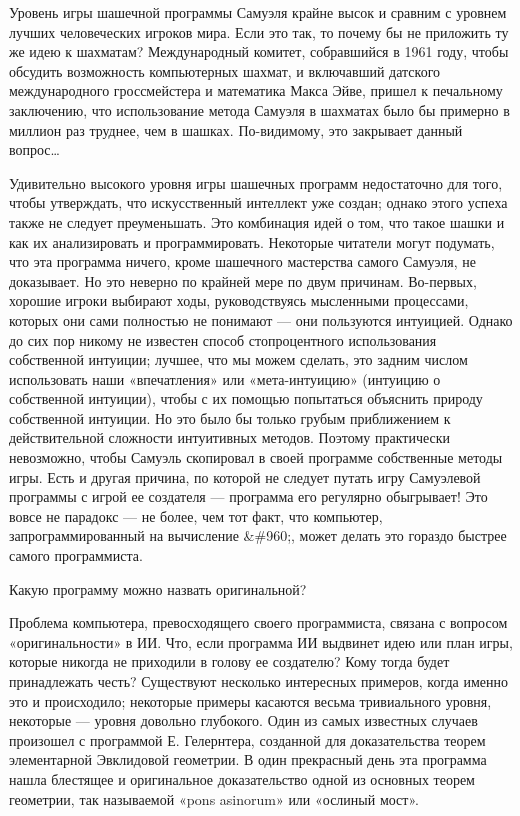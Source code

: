 \documentclass[../main.tex]{subfiles}
\begin{document}
Уровень игры шашечной программы Самуэля крайне высок и сравним с уровнем лучших человеческих игроков мира. Если это так, то почему бы не приложить ту же идею к шахматам? Международный комитет, собравшийся в 1961 году, чтобы обсудить возможность компьютерных шахмат, и включавший датского международного гроссмейстера и математика Макса Эйве, пришел к печальному заключению, что использование метода Самуэля в шахматах было бы примерно в миллион раз труднее, чем в шашках. По-видимому, это закрывает данный вопрос\ldots{}

Удивительно высокого уровня игры шашечных программ недостаточно для того, чтобы утверждать, что искусственный интеллект уже создан; однако этого успеха также не следует преуменьшать. Это комбинация идей о том, что такое шашки и как их анализировать и программировать. Некоторые читатели могут подумать, что эта программа ничего, кроме шашечного мастерства самого Самуэля, не доказывает. Но это неверно по крайней мере по двум причинам. Во-первых, хорошие игроки выбирают ходы, руководствуясь мысленными процессами, которых они сами полностью не понимают --- они пользуются интуицией. Однако до сих пор никому не известен способ стопроцентного использования собственной интуиции; лучшее, что мы можем сделать, это задним числом использовать наши «впечатления» или «мета-интуицию» (интуицию о собственной интуиции), чтобы с их помощью попытаться объяснить природу собственной интуиции. Но это было бы только грубым приближением к действительной сложности интуитивных методов. Поэтому практически невозможно, чтобы Самуэль скопировал в своей программе собственные методы игры. Есть и другая причина, по которой не следует путать игру Самуэлевой программы с игрой ее создателя --- программа его регулярно обыгрывает! Это вовсе не парадокс --- не более, чем тот факт, что компьютер, запрограммированный на вычисление \&\#960;, может делать это гораздо быстрее самого программиста.

Какую программу можно назвать оригинальной?

Проблема компьютера, превосходящего своего программиста, связана с вопросом «оригинальности» в ИИ. Что, если программа ИИ выдвинет идею или план игры, которые никогда не приходили в голову ее создателю? Кому тогда будет принадлежать честь? Существуют несколько интересных примеров, когда именно это и происходило; некоторые примеры касаются весьма тривиального уровня, некоторые --- уровня довольно глубокого. Один из самых известных случаев произошел с программой Е. Гелернтера, созданной для доказательства теорем элементарной Эвклидовой геометрии. В один прекрасный день эта программа нашла блестящее и оригинальное доказательство одной из основных теорем геометрии, так называемой «pons asinorum» или «ослиный мост».
\end{document}
